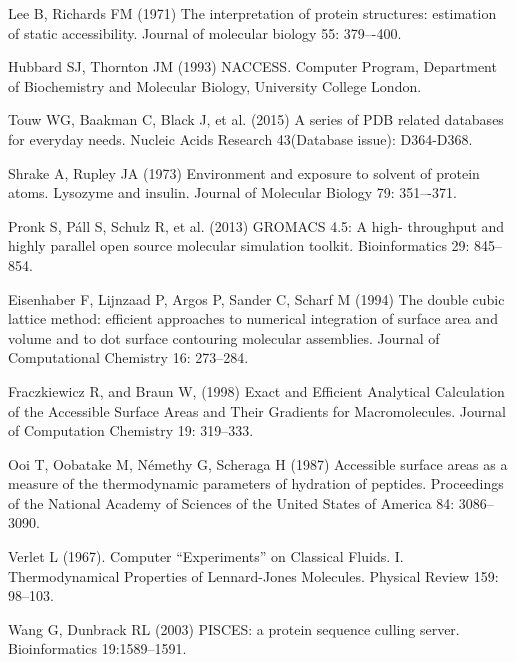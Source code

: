 \documentclass[a4paper,11pt]{article}
\begin{document}
\begin{small}

\begin{thebibliography}{50}

  Lee B, Richards FM (1971) The interpretation of protein
  structures: estimation of static accessibility. Journal of molecular
  biology 55: 379–-400.

  Hubbard SJ, Thornton JM (1993) NACCESS. Computer Program,
  Department of Biochemistry and Molecular Biology, University College
  London.

  Touw WG, Baakman C, Black J, et al. (2015)
  A series of PDB related databases for everyday needs.
  Nucleic Acids Research 43(Database issue): D364-D368.

  Shrake A, Rupley JA (1973) Environment and exposure to
  solvent of protein atoms. Lysozyme and insulin. Journal of Molecular
  Biology 79: 351–-371.

  Pronk S, Páll S, Schulz R, et al. (2013) GROMACS 4.5: A high-
  throughput and highly parallel open source molecular simulation
  toolkit. Bioinformatics 29: 845--854.

  Eisenhaber F, Lijnzaad P, Argos P, Sander C, Scharf M (1994)
  The double cubic lattice method: efficient approaches to numerical
  integration of surface area and volume and to dot surface contouring
  molecular assemblies. Journal of Computational Chemistry 16: 273--284.

  Fraczkiewicz R, and Braun W, (1998) Exact and Efficient Analytical
  Calculation of the Accessible Surface Areas and Their Gradients for
  Macromolecules. Journal of Computation Chemistry 19: 319--333.

  Ooi T, Oobatake M, Némethy G, Scheraga H (1987)
  Accessible surface areas as a measure of the thermodynamic
  parameters of hydration of peptides. Proceedings of the National
  Academy of Sciences of the United States of America 84: 3086–3090.

  Verlet L (1967). Computer ``Experiments'' on Classical
  Fluids. I. Thermodynamical Properties of Lennard-Jones
  Molecules. Physical Review 159: 98--103.

  Wang G, Dunbrack RL (2003) PISCES: a protein sequence culling server. 
  Bioinformatics 19:1589--1591.

\end{thebibliography}

\end{small}
\end{document}
